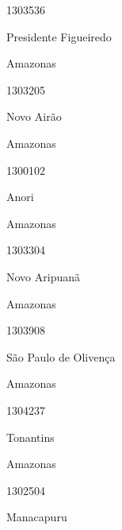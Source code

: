 \documentclass[
  letterpaper,
]{report}
\begin{document}
\n      

1303536

\n      

Presidente Figueiredo

\n    

\n    

\n      

Amazonas

\n      

1303205

\n      

Novo Airão

\n    

\n    

\n      

Amazonas

\n      

1300102

\n      

Anori

\n    

\n    

\n      

Amazonas

\n      

1303304

\n      

Novo Aripuanã

\n    

\n    

\n      

Amazonas

\n      

1303908

\n      

São Paulo de Olivença

\n    

\n    

\n      

Amazonas

\n      

1304237

\n      

Tonantins

\n    

\n    

\n      

Amazonas

\n      

1302504

\n      

Manacapuru
\end{document}
